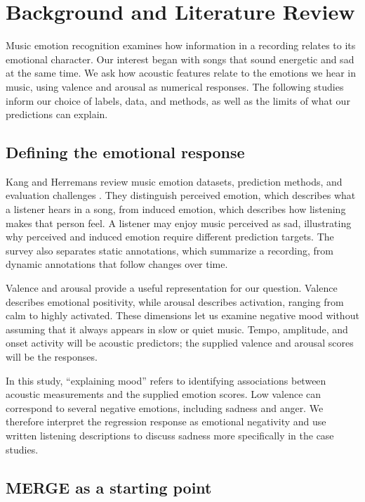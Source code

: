 \section{Background and Literature Review}
\label{sec:literature}

Music emotion recognition examines how information in a recording relates to its emotional character. Our interest began with songs that sound energetic and sad at the same time. We ask how acoustic features relate to the emotions we hear in music, using valence and arousal as numerical responses. The following studies inform our choice of labels, data, and methods, as well as the limits of what our predictions can explain.

\subsection{Defining the emotional response}

Kang and Herremans review music emotion datasets, prediction methods, and evaluation challenges \cite[Secs.~II and V]{kang2025survey}. They distinguish perceived emotion, which describes what a listener hears in a song, from induced emotion, which describes how listening makes that person feel. A listener may enjoy music perceived as sad, illustrating why perceived and induced emotion require different prediction targets. The survey also separates static annotations, which summarize a recording, from dynamic annotations that follow changes over time.

Valence and arousal provide a useful representation for our question. Valence describes emotional positivity, while arousal describes activation, ranging from calm to highly activated. These dimensions let us examine negative mood without assuming that it always appears in slow or quiet music. Tempo, amplitude, and onset activity will be acoustic predictors; the supplied valence and arousal scores will be the responses.

In this study, ``explaining mood'' refers to identifying associations between acoustic measurements and the supplied emotion scores. Low valence can correspond to several negative emotions, including sadness and anger. We therefore interpret the regression response as emotional negativity and use written listening descriptions to discuss sadness more specifically in the case studies.

\subsection{MERGE as a starting point}


